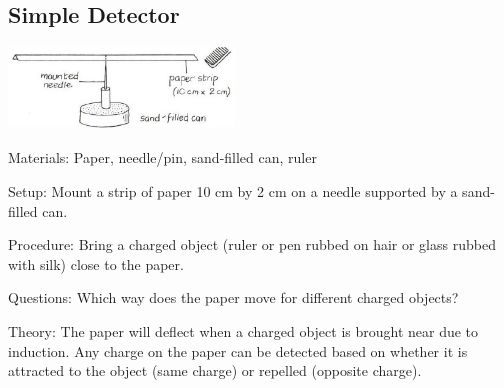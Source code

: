 \begin{multicols}{2}
\subsection{Simple Detector}

\begin{center}
\includegraphics[width=0.45\textwidth]{./img/vso/simple-detector.png}
\end{center}

\begin{description*}
\item[Materials:]{Paper, needle/pin, sand-filled can, ruler}
\item[Setup:]{Mount a strip of paper 10 cm by 2 cm on a needle supported by a sand-filled can.}
\item[Procedure:]{Bring a charged object (ruler or pen rubbed on hair or glass rubbed with silk) close to the paper.}
\item[Questions:]{Which way does the paper move for different charged objects?}
\item[Theory:]{The paper will deflect when a charged object is brought near due to induction. Any charge on the paper can be detected based on whether it is attracted to the object (same charge) or repelled (opposite charge).}
\end{description*}



\end{multicols}
